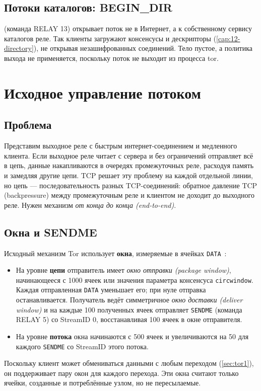 \subsection{Потоки каталогов: BEGIN\_DIR}

 (команда RELAY 13) открывает поток не в Интернет, а к собственному сервису каталогов реле. Так клиенты загружают консенсусы и дескрипторы (\cref{cap:12-directory}), не открывая незашифрованных соединений. Тело пустое, а политика выхода не применяется, поскольку поток не выходит из процесса tor.

\section{Исходное управление потоком}\label{sec:flusso-classico}

\subsection{Проблема}

Представим выходное реле с быстрым интернет-соединением и медленного клиента. Если выходное реле читает с сервера и без ограничений отправляет всё в цепь, данные накапливаются в очередях промежуточных реле, расходуя память и замедляя другие цепи. TCP решает эту проблему на каждой отдельной линии, но цепь --- последовательность разных TCP-соединений: обратное давление TCP (backpressure) между промежуточным реле и клиентом не доходит до выходного реле. Нужен механизм \emph{от конца до конца (end-to-end)}.

\subsection{Окна и SENDME}

Исходный механизм Tor использует \textbf{окна}, измеряемые в ячейках \texttt{DATA}~:
\begin{itemize}
  \item На уровне \textbf{цепи} отправитель имеет \emph{окно отправки (package window)}, начинающееся с 1000 ячеек или значения параметра консенсуса \texttt{circwindow}. Каждая отправленная \texttt{DATA} уменьшает его; при нуле отправка останавливается. Получатель ведёт симметричное \emph{окно доставки (deliver window)} и на каждые 100 полученных ячеек отправляет \texttt{SENDME} (команда RELAY 5) со StreamID 0, восстанавливая 100 ячеек в окне отправителя.
  \item На уровне \textbf{потока} окна начинаются с 500 ячеек и увеличиваются на 50 для каждого \texttt{SENDME} со StreamID этого потока.
\end{itemize}
Поскольку клиент может обмениваться данными с любым переходом (\cref{sec:tor1}), он поддерживает пару окон для каждого перехода. Эти окна считают только ячейки, созданные и потреблённые узлом, но не пересылаемые.

